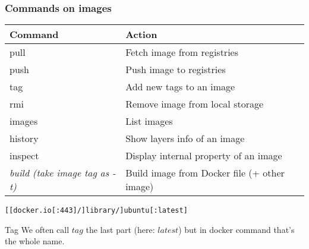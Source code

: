 \documentclass{beamer}
\begin{document}
\begin{frame}[fragile]
    \frametitle{Commands on images}
    \begin{center}
    {\scriptsize
        \begin{table}
	    \begin{tabular}{|l|l|} \hline \rowcolor{lightgray}
Command                           & Action                                        \\ \hline
pull                              & Fetch image from registries                   \\ \hline
push                              & Push image to registries                      \\ \hline
tag                               & Add new tags to an image                      \\ \hline
rmi                               & Remove image from local storage               \\ \hline
images                            & List images                                   \\ \hline
history                           & Show layers info of an image                  \\ \hline
inspect                           & Display internal property of an image         \\ \hline
{\it build (take image tag as -t)} & Build image from Docker file (+ other image) \\ \hline
        \end{tabular}
        \end{table}
    }
    \vfill
    \begin{verbatim}
[[docker.io[:443]/]library/]ubuntu[:latest]
    \end{verbatim}

    \begin{alertblock}{Tag}
    We often call $tag$ the last part (here: $latest$) but in docker command that's the whole name.
    \end{alertblock}
\end{center}

\end{frame}
\end{document}
